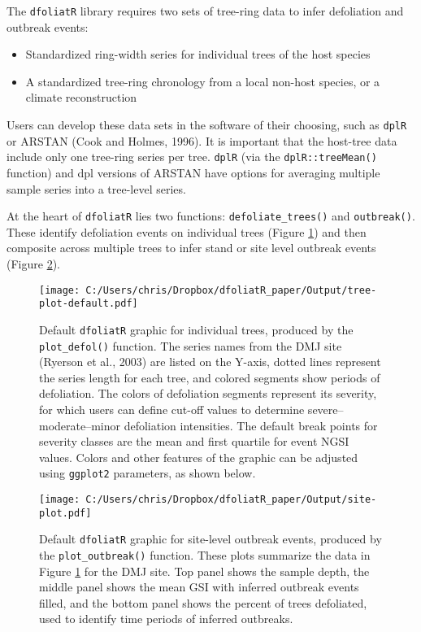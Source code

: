 \documentclass[review]{elsarticle} %
\providecommand{\tightlist}{%
  \setlength{\itemsep}{0pt}\setlength{\parskip}{0pt}}
\begin{document}
The \texttt{dfoliatR} library requires two sets of tree-ring data to infer defoliation and outbreak events:

\begin{itemize}
\tightlist
\item
  Standardized ring-width series for individual trees of the host species
\item
  A standardized tree-ring chronology from a local non-host species, or a climate reconstruction
\end{itemize}

Users can develop these data sets in the software of their choosing, such as \texttt{dplR} or ARSTAN (Cook and Holmes, 1996). It is important that the host-tree data include only one tree-ring series per tree. \texttt{dplR} (via the \texttt{dplR::treeMean()} function) and dpl versions of ARSTAN have options for averaging multiple sample series into a tree-level series.

At the heart of \texttt{dfoliatR} lies two functions: \texttt{defoliate\_trees()} and \texttt{outbreak()}. These identify defoliation events on individual trees (Figure \ref{fig:fig-defol}) and then composite across multiple trees to infer stand or site level outbreak events (Figure \ref{fig:fig-obr}).



\begin{figure}
\centering
\texttt{[image: C:/Users/chris/Dropbox/dfoliatR\_paper/Output/tree-plot-default.pdf]}
\caption{\label{fig:fig-defol}Default \texttt{dfoliatR} graphic for individual trees, produced by the \texttt{plot\_defol()} function. The series names from the DMJ site (Ryerson et al., 2003) are listed on the Y-axis, dotted lines represent the series length for each tree, and colored segments show periods of defoliation. The colors of defoliation segments represent its severity, for which users can define cut-off values to determine severe--moderate--minor defoliation intensities. The default break points for severity classes are the mean and first quartile for event NGSI values. Colors and other features of the graphic can be adjusted using \texttt{ggplot2} parameters, as shown below.}
\end{figure}



\begin{figure}
\centering
\texttt{[image: C:/Users/chris/Dropbox/dfoliatR\_paper/Output/site-plot.pdf]}
\caption{\label{fig:fig-obr}Default \texttt{dfoliatR} graphic for site-level outbreak events, produced by the \texttt{plot\_outbreak()} function. These plots summarize the data in Figure \ref{fig:fig-defol} for the DMJ site. Top panel shows the sample depth, the middle panel shows the mean GSI with inferred outbreak events filled, and the bottom panel shows the percent of trees defoliated, used to identify time periods of inferred outbreaks.}
\end{figure}
\end{document}
